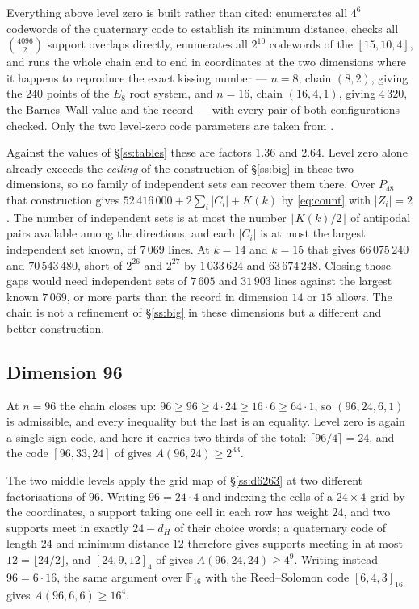 \documentclass[11pt]{amsart}
\theoremstyle{remark}
\newcommand{\Pff}{P_{48}}
\begin{document}
Everything above level zero is built rather than cited: \cite{repo} enumerates all
$4^6$ codewords of the quaternary code to establish its minimum distance, checks all
$\binom{4096}{2}$ support overlaps directly, enumerates all $2^{10}$ codewords of the
$[15,10,4]$, and runs the whole chain end to end in coordinates at the two dimensions
where it happens to reproduce the exact kissing number --- $n=8$, chain $(8,2)$,
giving the $240$ points of the $E_8$ root system, and $n=16$, chain $(16,4,1)$, giving
$4\,320$, the Barnes--Wall value and the record --- with every pair of both
configurations checked. Only the two level-zero code parameters are taken from
\cite{codetables}.

Against the values of \S\ref{ss:tables} these are factors $1.36$ and $2.64$. Level
zero alone already exceeds the \emph{ceiling} of the construction of
\S\ref{ss:big} in these two dimensions, so no family of independent sets can
recover them there. Over $\Pff$ that construction gives
$52\,416\,000+2\sum_i|C_i|+K(k)$ by \eqref{eq:count} with $|Z_i|=2$. The number
of independent sets is at most the number $\lfloor K(k)/2\rfloor$ of antipodal
pairs available among the directions, and each $|C_i|$ is at most the largest
independent set known, of $7\,069$ lines. At $k=14$ and $k=15$ that gives
$66\,075\,240$ and $70\,543\,480$, short of $2^{26}$ and $2^{27}$ by
$1\,033\,624$ and $63\,674\,248$. Closing those gaps would need independent sets
of $7\,605$ and $31\,903$ lines against the largest known $7\,069$, or more parts
than the record in dimension $14$ or $15$ allows. The chain is not a refinement of
\S\ref{ss:big} in these dimensions but a different and better construction.

\subsection{Dimension 96}\label{ss:d96}

At $n=96$ the chain closes up: $96\ge96\ge4\cdot24\ge16\cdot6\ge64\cdot1$, so
$(96,24,6,1)$ is admissible, and every inequality but the last is an equality.
Level zero is again a single sign code, and here it carries two thirds of the
total: $\lceil96/4\rceil=24$, and the code $[96,33,24]$ of \cite{codetables}
gives $A(96,24)\ge2^{33}$.

The two middle levels apply the grid map of \S\ref{ss:d6263} at two different
factorisations of $96$. Writing $96=24\cdot4$ and indexing the cells of a
$24\times4$ grid by the coordinates, a support taking one cell in each row has
weight $24$, and two supports meet in exactly $24-d_H$ of their choice words; a
quaternary code of length $24$ and minimum distance $12$ therefore gives supports
meeting in at most $12=\lfloor24/2\rfloor$, and $[24,9,12]_4$ of \cite{codetables} gives
$A(96,24,24)\ge4^9$. Writing instead $96=6\cdot16$, the same argument over
$\mathbb F_{16}$ with the Reed--Solomon code $[6,4,3]_{16}$ gives
$A(96,6,6)\ge16^4$.
\end{document}
